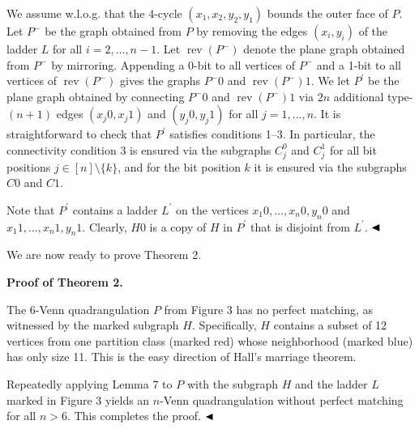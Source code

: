\documentclass[10pt,a4paper]{article}
\begin{document}
We assume w.l.o.g. that the 4-cycle $(x_{1},x_{2},y_{2},y_{1})$ bounds the outer face of $P$. Let $P^{-}$ be the graph obtained from $P$ by removing the edges $(x_{i},y_{i})$ of the ladder $L$ for all $i=2,\ldots,n-1$. Let $\operatorname{rev}(P^{-})$ denote the plane graph obtained from $P^{-}$ by mirroring. Appending a 0-bit to all vertices of $P^{-}$ and a 1-bit to all vertices of $\operatorname{rev}(P^{-})$ gives the graphs $P^{-}0$ and $\operatorname{rev}(P^{-})1$. We let $P^{\prime}$ be the plane graph obtained by connecting $P^{-}0$ and $\operatorname{rev}(P^{-})1$ via $2n$ additional type-$(n+1)$ edges $(x_{j}0,x_{j}1)$ and $(y_{j}0,y_{j}1)$ for all $j=1,\ldots,n$. It is straightforward to check that $P^{\prime}$ satisfies conditions 1–3. In particular, the connectivity condition 3 is ensured via the subgraphs $C_{j}^{0}$ and $C_{j}^{1}$ for all bit positions $j\in[n]\setminus\{k\}$, and for the bit position $k$ it is ensured via the subgraphs $C0$ and $C1$.
\par
\par
Note that $P^{\prime}$ contains a ladder $L^{\prime}$ on the vertices $x_{1}0,\ldots,x_{n}0,y_{n}0$ and $x_{1}1,\ldots,x_{n}1,y_{n}1$. Clearly, $H0$ is a copy of $H$ in $P^{\prime}$ that is disjoint from $L^{\prime}$. $\hfill\blacktriangleleft$
\par
\par
We are now ready to prove Theorem 2.
\par
\par
\par\medskip\noindent\textbf{Proof of Theorem 2.}\par
The 6-Venn quadrangulation $P$ from Figure 3 has no perfect matching, as witnessed by the marked subgraph $H$. Specifically, $H$ contains a subset of 12 vertices from one partition class (marked red) whose neighborhood (marked blue) has only size 11. This is the easy direction of Hall’s marriage theorem.
\par
\par
Repeatedly applying Lemma 7 to $P$ with the subgraph $H$ and the ladder $L$ marked in Figure 3 yields an $n$-Venn quadrangulation without perfect matching for all $n>6$. This completes the proof. $\hfill\blacktriangleleft$
\par
\end{document}
